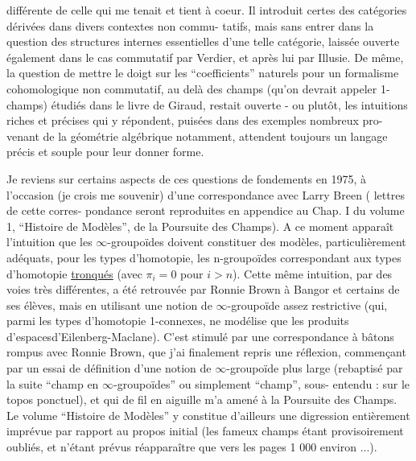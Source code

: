 
différente de celle qui me tenait et tient à coeur. Il introduit
certes des catégories dérivées dans divers contextes non commu-%
tatifs, mais sans entrer dans la question des structures internes
essentielles d'une telle catégorie, laissée ouverte également
dans le cas commutatif par Verdier, et après lui par Illusie. De
même, la question de mettre le doigt sur les ``coefficients''
naturels pour un formalisme cohomologique non commutatif, au delà
des champs (qu'on devrait appeler 1-champs) étudiés dans le livre
de Giraud, restait ouverte - ou plutôt, les intuitions riches et
précises qui y répondent, puisées dans des exemples nombreux pro-%
venant de la géométrie algébrique notamment, attendent toujours
un langage précis et souple pour leur donner forme.

Je reviens sur certains aspects de ces questions de
fondements en 1975, à l'occasion (je crois me souvenir) d'une
correspondance avec Larry Breen ( lettres de cette corres-%
pondance seront reproduites en appendice au Chap. I du volume 1,
``Histoire de Modèles'', de la Poursuite des Champs). A ce moment
apparaît l'intuition que les $\infty$-groupoïdes doivent constituer des
modèles, particulièrement adéquats, pour les types d'homotopie,
les n-groupoïdes correspondant aux types d'homotopie \uline{tronqués}
(avec $\pi_i = 0$ pour $i > n$). Cette même intuition, par des voies
très différentes, a été retrouvée par Ronnie Brown à Bangor et
certains de ses élèves, mais en utilisant une notion de $\infty$-groupoïde
assez restrictive (qui, parmi les types d'homotopie 1-connexes,
ne modélise que les produits d'espacesd'Eilenberg-Maclane). C'est
stimulé par une correspondance à bâtons rompus avec Ronnie Brown,
que j'ai finalement repris une réflexion, commençant par un essai
de définition d'une notion de $\infty$-groupoïde plus large (rebaptisé
par la suite ``champ en $\infty$-groupoïdes'' ou simplement ``champ'', sous-%
entendu : sur le topos ponctuel), et qui de fil en aiguille m'a
amené à la Poursuite des Champs. Le volume ``Histoire de Modèles''
y constitue d'ailleurs une digression entièrement imprévue par
rapport au propos initial (les fameux champs étant provisoirement
oubliés, et n'étant prévus réapparaître que vers les pages 1 000
environ ...).

